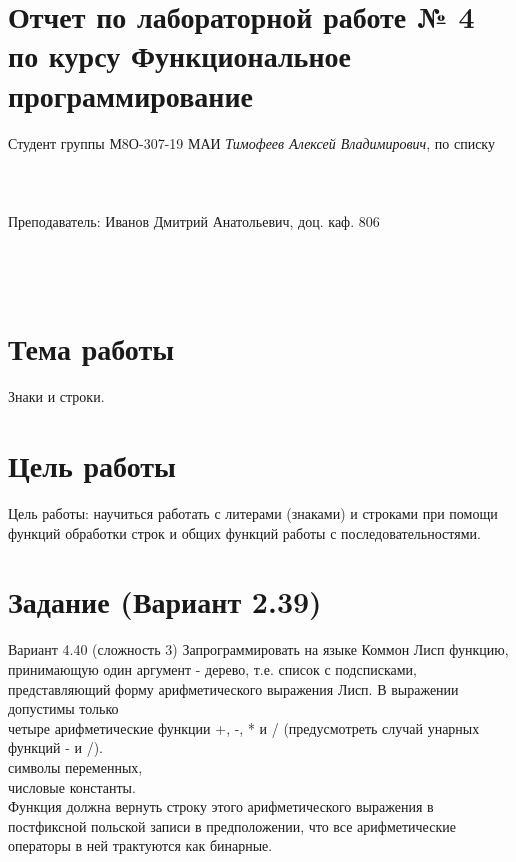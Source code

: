 \documentclass[12pt]{article}
\begin{document}
\section*{Отчет по лабораторной работе № 4 \\
по курсу \guillemotleft Функциональное программирование\guillemotright}
\begin{flushright}
Студент группы М8О-307-19 МАИ \textit{Тимофеев Алексей Владимирович},  по списку \\
 \\
 \\
\ \\
Преподаватель: Иванов Дмитрий Анатольевич, доц. каф. 806 \\
 \\
 \\
 \\

\end{flushright}

\section{Тема работы}
Знаки и строки.

\section{Цель работы}
Цель работы: научиться работать с литерами (знаками) и строками при помощи функций обработки строк и общих функций работы с последовательностями.

\section{Задание (Вариант 2.39)}
Вариант 4.40 (сложность 3)
Запрограммировать на языке Коммон Лисп функцию, принимающую один аргумент - дерево, т.е. список с подсписками, представляющий форму арифметического выражения Лисп. В выражении допустимы только\\
четыре арифметические функции +, -, * и / (предусмотреть случай унарных функций - и /).\\
символы переменных,\\
числовые константы.\\
Функция должна вернуть строку этого арифметического выражения в постфиксной польской записи в предположении, что все арифметические операторы в ней трактуются как бинарные.\\
\end{document}
